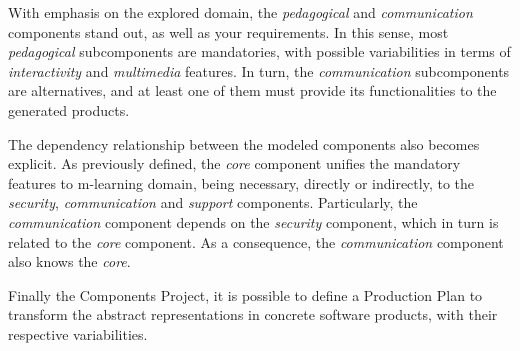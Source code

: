 With emphasis on the explored domain, the \textit{pedagogical} and \textit{communication} components stand out, as well as your requirements. In this sense, most \textit{pedagogical} subcomponents are mandatories, with possible variabilities in terms of \textit{interactivity} and \textit{multimedia} features. In turn, the \textit{communication} subcomponents are alternatives, and at least one of them must provide its functionalities to the generated products.

The dependency relationship between the modeled components also becomes explicit. As previously defined, the \textit{core} component unifies the mandatory features to m-learning domain, being necessary, directly or indirectly, to the \textit{security}, \textit{communication} and \textit{support} components. Particularly, the \textit{communication} component depends on the \textit{security} component, which in turn is related to the \textit{core} component. As a consequence, the \textit{communication} component also knows the \textit{core}.

Finally the Components Project, it is possible to define a Production Plan to transform the abstract representations in concrete software products, with their respective variabilities.

